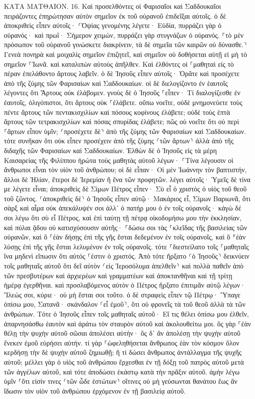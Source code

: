 \documentclass[twoside, 9pt]{extreport}
\begin{document}
ΚΑΤΑ ΜΑΤΘΑΙΟΝ.
16.
Καὶ προσελθόντες οἱ Φαρισαῖοι καὶ Σαδδουκαῖοι πειράζοντες ἐπηρώτησαν αὐτὸν σημεῖον ἐκ τοῦ οὐρανοῦ ἐπιδεῖξαι αὐτοῖς. 
ὁ δὲ ἀποκριθεὶς εἶπεν αὐτοῖς· ⸂Ὀψίας γενομένης λέγετε· Εὐδία, πυρράζει γὰρ ὁ οὐρανός· 
καὶ πρωΐ· Σήμερον χειμών, πυρράζει γὰρ στυγνάζων ὁ οὐρανός. ⸀τὸ μὲν πρόσωπον τοῦ οὐρανοῦ γινώσκετε διακρίνειν, τὰ δὲ σημεῖα τῶν καιρῶν οὐ δύνασθε.⸃ 
Γενεὰ πονηρὰ καὶ μοιχαλὶς σημεῖον ἐπιζητεῖ, καὶ σημεῖον οὐ δοθήσεται αὐτῇ εἰ μὴ τὸ σημεῖον ⸀Ἰωνᾶ. καὶ καταλιπὼν αὐτοὺς ἀπῆλθεν. 
Καὶ ἐλθόντες οἱ ⸀μαθηταὶ εἰς τὸ πέραν ἐπελάθοντο ἄρτους λαβεῖν. 
ὁ δὲ Ἰησοῦς εἶπεν αὐτοῖς· Ὁρᾶτε καὶ προσέχετε ἀπὸ τῆς ζύμης τῶν Φαρισαίων καὶ Σαδδουκαίων. 
οἱ δὲ διελογίζοντο ἐν ἑαυτοῖς λέγοντες ὅτι Ἄρτους οὐκ ἐλάβομεν. 
γνοὺς δὲ ὁ Ἰησοῦς ⸀εἶπεν· Τί διαλογίζεσθε ἐν ἑαυτοῖς, ὀλιγόπιστοι, ὅτι ἄρτους οὐκ ⸀ἐλάβετε. 
οὔπω νοεῖτε, οὐδὲ μνημονεύετε τοὺς πέντε ἄρτους τῶν πεντακισχιλίων καὶ πόσους κοφίνους ἐλάβετε; 
οὐδὲ τοὺς ἑπτὰ ἄρτους τῶν τετρακισχιλίων καὶ πόσας σπυρίδας ἐλάβετε; 
πῶς οὐ νοεῖτε ὅτι οὐ περὶ ⸀ἄρτων εἶπον ὑμῖν; ⸂προσέχετε δὲ⸃ ἀπὸ τῆς ζύμης τῶν Φαρισαίων καὶ Σαδδουκαίων. 
τότε συνῆκαν ὅτι οὐκ εἶπεν προσέχειν ἀπὸ τῆς ζύμης ⸂τῶν ἄρτων⸃ ἀλλὰ ἀπὸ τῆς διδαχῆς τῶν Φαρισαίων καὶ Σαδδουκαίων. 
Ἐλθὼν δὲ ὁ Ἰησοῦς εἰς τὰ μέρη Καισαρείας τῆς Φιλίππου ἠρώτα τοὺς μαθητὰς αὐτοῦ λέγων· ⸀Τίνα λέγουσιν οἱ ἄνθρωποι εἶναι τὸν υἱὸν τοῦ ἀνθρώπου; 
οἱ δὲ εἶπαν· Οἱ μὲν Ἰωάννην τὸν βαπτιστήν, ἄλλοι δὲ Ἠλίαν, ἕτεροι δὲ Ἰερεμίαν ἢ ἕνα τῶν προφητῶν. 
λέγει αὐτοῖς· Ὑμεῖς δὲ τίνα με λέγετε εἶναι; 
ἀποκριθεὶς δὲ Σίμων Πέτρος εἶπεν· Σὺ εἶ ὁ χριστὸς ὁ υἱὸς τοῦ θεοῦ τοῦ ζῶντος. 
⸂ἀποκριθεὶς δὲ⸃ ὁ Ἰησοῦς εἶπεν αὐτῷ· Μακάριος εἶ, Σίμων Βαριωνᾶ, ὅτι σὰρξ καὶ αἷμα οὐκ ἀπεκάλυψέν σοι ἀλλ᾽ ὁ πατήρ μου ὁ ἐν τοῖς οὐρανοῖς· 
κἀγὼ δέ σοι λέγω ὅτι σὺ εἶ Πέτρος, καὶ ἐπὶ ταύτῃ τῇ πέτρᾳ οἰκοδομήσω μου τὴν ἐκκλησίαν, καὶ πύλαι ᾅδου οὐ κατισχύσουσιν αὐτῆς· 
⸀δώσω σοι τὰς ⸀κλεῖδας τῆς βασιλείας τῶν οὐρανῶν, καὶ ὃ ⸀ἐὰν δήσῃς ἐπὶ τῆς γῆς ἔσται δεδεμένον ἐν τοῖς οὐρανοῖς, καὶ ὃ ⸁ἐὰν λύσῃς ἐπὶ τῆς γῆς ἔσται λελυμένον ἐν τοῖς οὐρανοῖς. 
τότε ⸀διεστείλατο τοῖς ⸀μαθηταῖς ἵνα μηδενὶ εἴπωσιν ὅτι αὐτός ⸀ἐστιν ὁ χριστός. 
Ἀπὸ τότε ἤρξατο ⸂ὁ Ἰησοῦς⸃ δεικνύειν τοῖς μαθηταῖς αὐτοῦ ὅτι δεῖ αὐτὸν ⸂εἰς Ἱεροσόλυμα ἀπελθεῖν⸃ καὶ πολλὰ παθεῖν ἀπὸ τῶν πρεσβυτέρων καὶ ἀρχιερέων καὶ γραμματέων καὶ ἀποκτανθῆναι καὶ τῇ τρίτῃ ἡμέρᾳ ἐγερθῆναι. 
καὶ προσλαβόμενος αὐτὸν ὁ Πέτρος ἤρξατο ἐπιτιμᾶν αὐτῷ λέγων· Ἵλεώς σοι, κύριε· οὐ μὴ ἔσται σοι τοῦτο. 
ὁ δὲ στραφεὶς εἶπεν τῷ Πέτρῳ· Ὕπαγε ὀπίσω μου, Σατανᾶ· σκάνδαλον ⸂εἶ ἐμοῦ⸃, ὅτι οὐ φρονεῖς τὰ τοῦ θεοῦ ἀλλὰ τὰ τῶν ἀνθρώπων. 
Τότε ὁ Ἰησοῦς εἶπεν τοῖς μαθηταῖς αὐτοῦ· Εἴ τις θέλει ὀπίσω μου ἐλθεῖν, ἀπαρνησάσθω ἑαυτὸν καὶ ἀράτω τὸν σταυρὸν αὐτοῦ καὶ ἀκολουθείτω μοι. 
ὃς γὰρ ⸀ἐὰν θέλῃ τὴν ψυχὴν αὐτοῦ σῶσαι ἀπολέσει αὐτήν· ὃς δ᾽ ἂν ἀπολέσῃ τὴν ψυχὴν αὐτοῦ ἕνεκεν ἐμοῦ εὑρήσει αὐτήν. 
τί γὰρ ⸀ὠφεληθήσεται ἄνθρωπος ἐὰν τὸν κόσμον ὅλον κερδήσῃ τὴν δὲ ψυχὴν αὐτοῦ ζημιωθῇ; ἢ τί δώσει ἄνθρωπος ἀντάλλαγμα τῆς ψυχῆς αὐτοῦ; 
μέλλει γὰρ ὁ υἱὸς τοῦ ἀνθρώπου ἔρχεσθαι ἐν τῇ δόξῃ τοῦ πατρὸς αὐτοῦ μετὰ τῶν ἀγγέλων αὐτοῦ, καὶ τότε ἀποδώσει ἑκάστῳ κατὰ τὴν πρᾶξιν αὐτοῦ. 
ἀμὴν λέγω ὑμῖν ⸀ὅτι εἰσίν τινες ⸂τῶν ὧδε ἑστώτων⸃ οἵτινες οὐ μὴ γεύσωνται θανάτου ἕως ἂν ἴδωσιν τὸν υἱὸν τοῦ ἀνθρώπου ἐρχόμενον ἐν τῇ βασιλείᾳ αὐτοῦ. 
\end{document}
